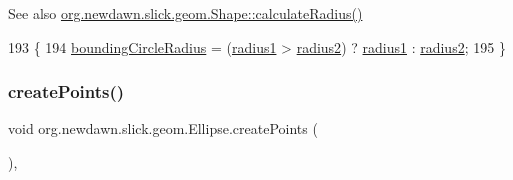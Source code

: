 \begin{DoxySeeAlso}{See also}
\mbox{\hyperlink{classorg_1_1newdawn_1_1slick_1_1geom_1_1_shape_a276adc040a678116054b860c4eb5adab}{org.\+newdawn.\+slick.\+geom.\+Shape\+::calculate\+Radius()}} 
\end{DoxySeeAlso}

\begin{DoxyCode}
193                                      \{
194         \mbox{\hyperlink{classorg_1_1newdawn_1_1slick_1_1geom_1_1_shape_ac89bf2b9c93a7294b49797fc7a054c11}{boundingCircleRadius}} = (\mbox{\hyperlink{classorg_1_1newdawn_1_1slick_1_1geom_1_1_ellipse_a26f6d13c3b22a475bc1caf33f84a24b9}{radius1}} > \mbox{\hyperlink{classorg_1_1newdawn_1_1slick_1_1geom_1_1_ellipse_ad3152cb17acd020ac3ae7bf70526ae9f}{radius2}}) ? 
      \mbox{\hyperlink{classorg_1_1newdawn_1_1slick_1_1geom_1_1_ellipse_a26f6d13c3b22a475bc1caf33f84a24b9}{radius1}} : \mbox{\hyperlink{classorg_1_1newdawn_1_1slick_1_1geom_1_1_ellipse_ad3152cb17acd020ac3ae7bf70526ae9f}{radius2}};
195     \}
\end{DoxyCode}
\mbox{\label{classorg_1_1newdawn_1_1slick_1_1geom_1_1_ellipse_a0a824727a85257c3014c4f565b611fba}} 
\subsubsection{\texorpdfstring{create\+Points()}{createPoints()}}
{\footnotesize\ttfamily void org.\+newdawn.\+slick.\+geom.\+Ellipse.\+create\+Points (\begin{DoxyParamCaption}{ }\end{DoxyParamCaption})\hspace{0.3cm}{\ttfamily [inline]}, {\ttfamily [protected]}}

